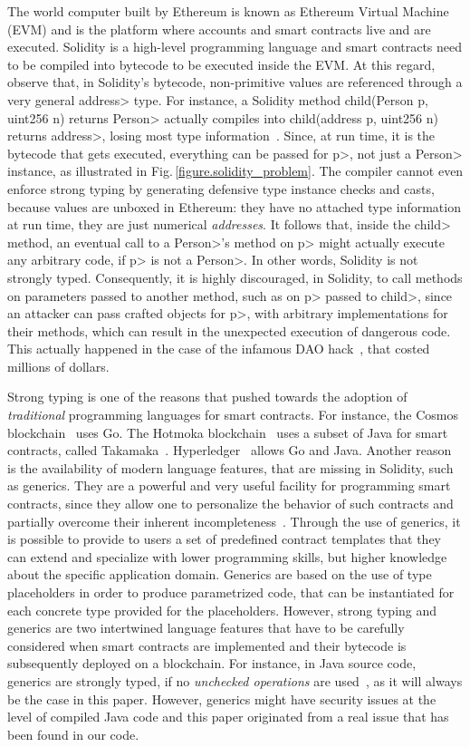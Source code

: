The world computer built by Ethereum is known as Ethereum Virtual Machine (EVM) and is the platform where accounts and smart contracts live and are executed.
Solidity is a high-level programming language and smart contracts need to be compiled into bytecode to be executed inside the EVM. At this regard, observe that, in Solidity's bytecode, non-primitive values are referenced through a very general \<address> type. For instance, a Solidity method \<child(Person p, uint256 n) returns Person> actually compiles into \<child(address p, uint256 n) returns address>, losing most type information~\cite{CrafaPZ19}. Since, at run time, it is the bytecode that gets executed, everything can be passed for \<p>, not just a \<Person> instance, as illustrated in Fig.\,\ref{figure.solidity_problem}.
The compiler cannot even enforce strong typing by generating defensive type instance checks and casts, because values are unboxed in Ethereum: they have no attached type information at run time, they are just numerical \emph{addresses}. It follows that, inside the \<child> method, an eventual call to a \<Person>'s method on \<p> might actually execute any arbitrary code, if \<p> is not a \<Person>. In other words, Solidity is not strongly typed. Consequently, it is highly discouraged, in Solidity, to call methods on parameters passed to another method, such as on \<p> passed to \<child>, since an attacker can pass crafted objects for \<p>, with arbitrary implementations for their methods, which can result in the unexpected execution of dangerous code. This actually happened in the case of the infamous DAO hack~\cite{dao16}, that costed millions of dollars.

Strong typing is one of the reasons that pushed towards the adoption
of \emph{traditional} programming languages for smart contracts. For instance,
the Cosmos blockchain~\cite{cosmos} uses Go. The
Hotmoka blockchain~\cite{hotmoka} uses a subset of Java
for smart contracts, called Takamaka~\cite{Spoto19,Spoto20}.
Hyperledger~\cite{hyperldeger} allows Go and Java.
Another reason is the availability of modern
language features, that are missing in Solidity,
such as generics. They are a powerful and very useful facility for programming
smart contracts, since they allow one to personalize the behavior of such contracts and partially overcome their inherent incompleteness~\cite{ebp}. 
%
Through the use of generics, it is possible to provide to users a set of predefined contract templates that they can extend and specialize with lower programming skills, but higher knowledge about the specific application domain. Generics are based on the use of type placeholders in order
to produce parametrized code, that can be instantiated for each
concrete type provided for the placeholders.
%
However, strong typing and generics are two intertwined language features that have to be carefully considered when smart contracts are implemented and their bytecode is subsequently deployed on a blockchain. For instance, in Java source code, generics are strongly typed, if no \emph{unchecked operations} are used~\cite{NaftalinW06}, as it will always be the case in this paper.
However, generics might have security issues at the level of compiled Java code and this paper originated from a real issue that has been found in our code.

